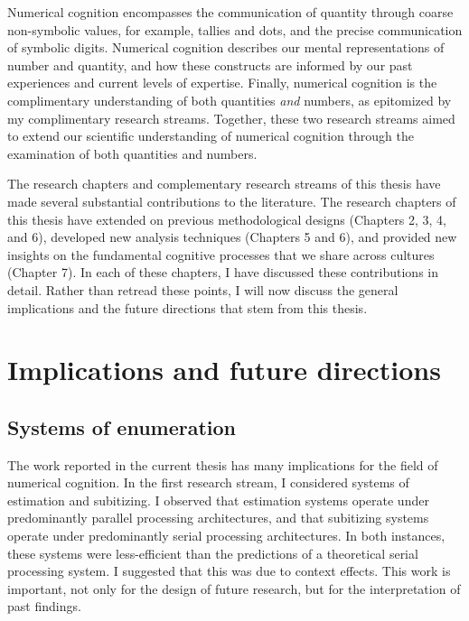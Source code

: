 Numerical cognition encompasses the communication of quantity through coarse non-symbolic values, for example, tallies and dots, and the precise communication of symbolic digits. Numerical cognition describes our mental representations of number and quantity, and how these constructs are informed by our past experiences and current levels of expertise. Finally, numerical cognition is the complimentary understanding of both quantities \textit{and} numbers, as epitomized by my complimentary research streams. Together, these two research streams aimed to extend our scientific understanding of numerical cognition through the examination of both quantities and numbers.

The research chapters and complementary research streams of this thesis have made several substantial contributions to the literature. The research chapters of this thesis have extended on previous methodological designs (Chapters 2, 3, 4, and 6), developed new analysis techniques (Chapters 5 and 6), and provided new insights on the fundamental cognitive processes that we share across cultures (Chapter 7). In each of these chapters, I have discussed these contributions in detail. Rather than retread these points, I will now discuss the general implications and the future directions that stem from this thesis. 


\section{Implications and future directions}
\subsection{Systems of enumeration}
The work reported in the current thesis has many implications for the field of numerical cognition. In the first research stream, I considered systems of estimation and subitizing. I observed that estimation systems operate under predominantly parallel processing architectures, and that subitizing systems operate under predominantly serial processing architectures. In both instances, these systems were less-efficient than the predictions of a theoretical serial processing system. I suggested that this was due to context effects. This work is important, not only for the design of future research, but for the interpretation of past findings. 

